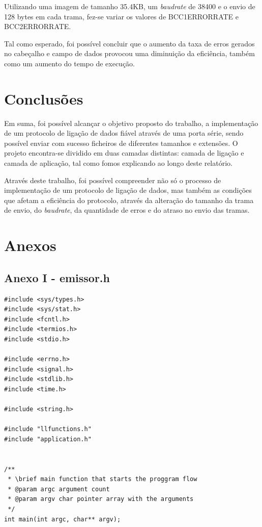 \documentclass[11pt]{article}
\begin{document}
Utilizando uma imagem de tamanho 35.4KB, um \textit{baudrate} de 38400 e o envio de 128 bytes em cada trama, fez-se variar os valores de BCC1ERRORRATE e BCC2ERRORRATE.

Tal como esperado, foi possível concluir que o aumento da taxa de erros gerados no cabeçalho e campo de dados provocou uma diminuição da eficiência, também como um aumento do tempo de execução.

\section{Conclusões}

Em suma, foi possível alcançar o objetivo proposto do trabalho, a implementação de um protocolo de ligação de dados fiável através de uma porta série, sendo possível enviar com sucesso ficheiros de diferentes tamanhos e extensões. O projeto encontra-se dividido em duas camadas distintas: camada de ligação e camada de aplicação, tal como fomos explicando ao longo deste relatório.

Através deste trabalho, foi possível compreender não só o processo de implementação de um protocolo de ligação de dados, mas também as condições que afetam a eficiência do protocolo, através da alteração do tamanho da trama de envio, do \textit{baudrate}, da quantidade de erros e do atraso no envio das tramas.


\section{Anexos}

\subsection{Anexo I - emissor.h}
\begin{lstlisting}[style=CStyle]
#include <sys/types.h>
#include <sys/stat.h>
#include <fcntl.h>
#include <termios.h>
#include <stdio.h>

#include <errno.h>
#include <signal.h>
#include <stdlib.h>
#include <time.h>

#include <string.h>

#include "llfunctions.h"
#include "application.h"


/**
 * \brief main function that starts the proggram flow
 * @param argc argument count
 * @param argv char pointer array with the arguments
 */
int main(int argc, char** argv);

\end{lstlisting}
\end{document}
